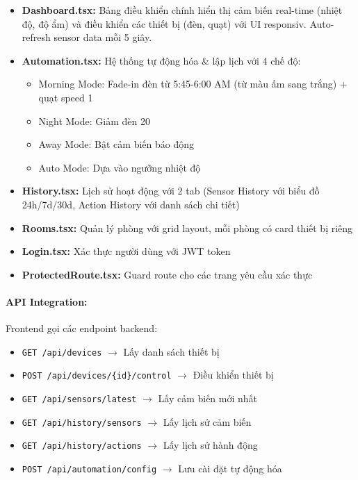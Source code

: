 \begin{itemize}
    \item \textbf{Dashboard.tsx:} Bảng điều khiển chính hiển thị cảm biến real-time (nhiệt độ, độ ẩm) và điều khiển các thiết bị (đèn, quạt) với UI responsiv. Auto-refresh sensor data mỗi 5 giây.
    
    \item \textbf{Automation.tsx:} Hệ thống tự động hóa & lập lịch với 4 chế độ:
    \begin{itemize}
        \item Morning Mode: Fade-in đèn từ 5:45-6:00 AM (từ màu ấm sang trắng) + quạt speed 1
        \item Night Mode: Giảm đèn 20%
        \item Away Mode: Bật cảm biến báo động
        \item Auto Mode: Dựa vào ngưỡng nhiệt độ
    \end{itemize}
    
    \item \textbf{History.tsx:} Lịch sử hoạt động với 2 tab (Sensor History với biểu đồ 24h/7d/30d, Action History với danh sách chi tiết)
    
    \item \textbf{Rooms.tsx:} Quản lý phòng với grid layout, mỗi phòng có card thiết bị riêng
    
    \item \textbf{Login.tsx:} Xác thực người dùng với JWT token
    
    \item \textbf{ProtectedRoute.tsx:} Guard route cho các trang yêu cầu xác thực
\end{itemize}

\paragraph{API Integration:}

Frontend gọi các endpoint backend:

\begin{itemize}
    \item \texttt{GET /api/devices} $\rightarrow$ Lấy danh sách thiết bị
    \item \texttt{POST /api/devices/\{id\}/control} $\rightarrow$ Điều khiển thiết bị
    \item \texttt{GET /api/sensors/latest} $\rightarrow$ Lấy cảm biến mới nhất
    \item \texttt{GET /api/history/sensors} $\rightarrow$ Lấy lịch sử cảm biến
    \item \texttt{GET /api/history/actions} $\rightarrow$ Lấy lịch sử hành động
    \item \texttt{POST /api/automation/config} $\rightarrow$ Lưu cài đặt tự động hóa
\end{itemize}

